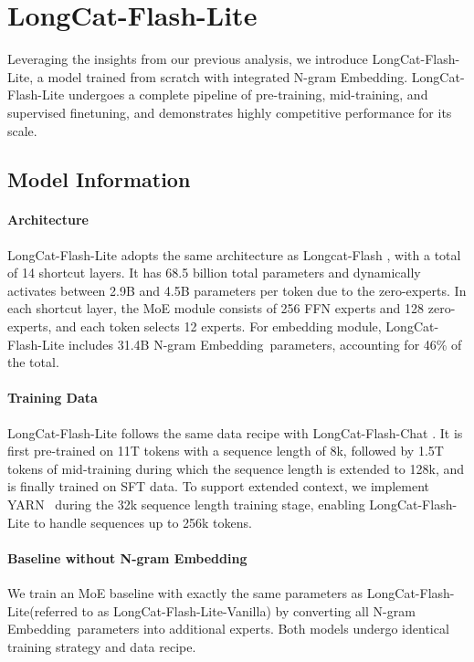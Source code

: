 \documentclass{article}
\newcommand{\longcat}{LongCat-Flash-Lite\xspace}
\newcommand{\method}{N-gram Embedding}
\begin{document}
\section{\longcat}
\label{sec:longcat}
Leveraging the insights from our previous analysis, we introduce \longcat, a model trained from scratch with integrated \method. \longcat undergoes a complete pipeline of pre-training, mid-training, and supervised finetuning, and demonstrates highly competitive performance for its scale.

\subsection{Model Information} 

\paragraph{Architecture} \longcat adopts the same architecture as Longcat-Flash \citep{meituanlongcatteam2025longcatflashtechnicalreport}, with a total of 14 shortcut layers. It has 68.5 billion total parameters and dynamically activates between 2.9B and 4.5B parameters per token due to the zero-experts. In each shortcut layer, the MoE module consists of 256 FFN experts and 128 zero-experts, and each token selects 12 experts. For embedding module, \longcat includes 31.4B \method\ parameters, accounting for 46\% of the total.

\paragraph{Training Data} \longcat follows the same data recipe with LongCat-Flash-Chat \citep{meituanlongcatteam2025longcatflashtechnicalreport}. It is first pre-trained on 11T tokens with a sequence length of 8k, followed by 1.5T tokens of mid-training during which the sequence length is extended to 128k, and is finally trained on SFT data. To support extended context, we implement YARN~\citep{Peng2023YaRNEC} during the 32k sequence length training stage, enabling \longcat to handle sequences up to 256k tokens.


\paragraph{Baseline without \method} We train an MoE baseline with exactly the same parameters as \longcat (referred to as \longcat-Vanilla) by converting all \method\ parameters into additional experts. Both models undergo identical training strategy and data recipe.
\end{document}
